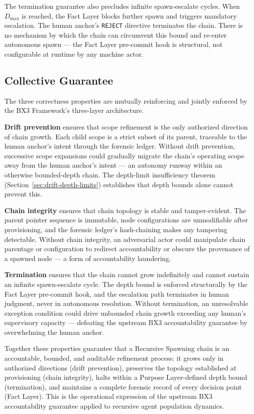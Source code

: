 The termination guarantee also precludes infinite spawn-escalate cycles. When $D_{\mathrm{max}}$ is reached, the Fact Layer blocks further spawn and triggers mandatory escalation. The human anchor's \texttt{REJECT} directive terminates the chain. There is no mechanism by which the chain can circumvent this bound and re-enter autonomous spawn --- the Fact Layer pre-commit hook is structural, not configurable at runtime by any machine actor.

\subsection{Collective Guarantee}
\label{sec:rs-collective-guarantee}

The three correctness properties are mutually reinforcing and jointly enforced by the BX3 Framework's three-layer architecture.

\medskip
\textbf{Drift prevention} ensures that scope refinement is the only authorized direction of chain growth. Each child scope is a strict subset of its parent, traceable to the human anchor's intent through the forensic ledger. Without drift prevention, successive scope expansions could gradually migrate the chain's operating scope away from the human anchor's intent --- an autonomy runway within an otherwise bounded-depth chain. The depth-limit insufficiency theorem (Section~\ref{sec:drift-depth-limits}) establishes that depth bounds alone cannot prevent this.

\medskip
\textbf{Chain integrity} ensures that chain topology is stable and tamper-evident. The parent pointer sequence is immutable, node configurations are unmodifiable after provisioning, and the forensic ledger's hash-chaining makes any tampering detectable. Without chain integrity, an adversarial actor could manipulate chain parentage or configuration to redirect accountability or obscure the provenance of a spawned node --- a form of accountability laundering.

\medskip
\textbf{Termination} ensures that the chain cannot grow indefinitely and cannot sustain an infinite spawn-escalate cycle. The depth bound is enforced structurally by the Fact Layer pre-commit hook, and the escalation path terminates in human judgment, never in autonomous resolution. Without termination, an unresolvable exception condition could drive unbounded chain growth exceeding any human's supervisory capacity --- defeating the upstream BX3 accountability guarantee by overwhelming the human anchor.

Together these properties guarantee that a Recursive Spawning chain is an accountable, bounded, and auditable refinement process: it grows only in authorized directions (drift prevention), preserves the topology established at provisioning (chain integrity), halts within a Purpose Layer-defined depth bound (termination), and maintains a complete forensic record of every decision point (Fact Layer). This is the operational expression of the upstream BX3 accountability guarantee applied to recursive agent population dynamics.